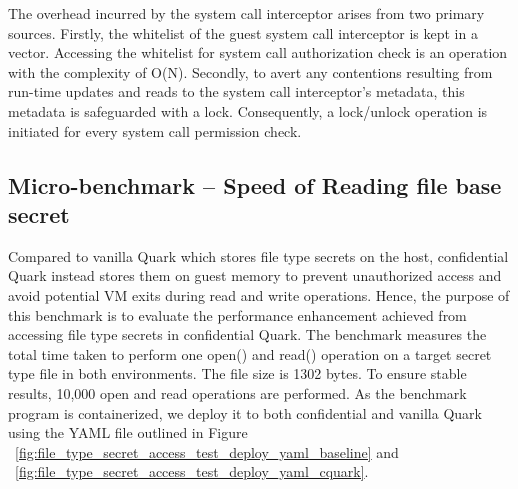 The overhead incurred by the system call interceptor arises from two primary sources. Firstly, the whitelist of the guest system call interceptor is kept in a vector. Accessing the whitelist for system call authorization check is an operation with the complexity of O(N). 
Secondly, to avert any contentions resulting from run-time updates and reads to the system call interceptor's metadata, this metadata is safeguarded with a lock. Consequently, a lock/unlock operation is initiated for every system call permission check.



\subsection{Micro-benchmark – Speed of Reading file base secret}\label{bench_reading_file_secret}

Compared to vanilla Quark which stores file type secrets on the host, confidential Quark instead stores them on guest memory to prevent unauthorized access and avoid potential VM exits during read and write operations. Hence, the purpose of this benchmark is to evaluate the performance 
enhancement achieved from accessing file type secrets in confidential Quark. The benchmark\cite*{benchamark_filebase_secret} measures the total time taken to perform one open() and read() operation on a target secret type file in both environments. The file size is 1302 bytes. To ensure stable results, 10,000 open and 
read operations are performed. As the benchmark program is containerized, we deploy it to both confidential and vanilla Quark using the YAML file outlined in Figure ~\ref{fig:file_type_secret_access_test_deploy_yaml_baseline} and ~\ref{fig:file_type_secret_access_test_deploy_yaml_cquark}.


% 

